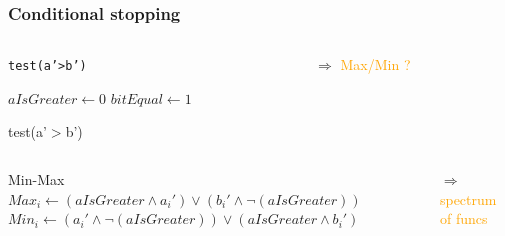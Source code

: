 \documentclass{beamer}
\begin{document}
\begin{frame} 
 \frametitle{Conditional stopping }
\linesnumbered 
\begin{columns}
\begin{column}[c]{9cm}

\begin{block}{\texttt{test(a'>b')}}
\begin{algorithm}[H]

\SetVline
 $aIsGreater \leftarrow 0$\;
 $bitEqual \leftarrow 1$\;
	

\caption{test(a'$>$b')\label{Code:algo}}
\end{algorithm}
\end{block}
\end{column}
\begin{column}[c]{2cm}

 $\Rightarrow$ \textcolor{orange}{Max/Min ?}
\end{column}
\end{columns} 
\pause
\begin{columns}
\begin{column}[c]{8cm}
\begin{block}{Min-Max}
 $Max_i \leftarrow (aIsGreater \wedge a_i') \vee (b_i'\wedge \neg(aIsGreater))$ \;
 $Min_i \leftarrow  (a_i' \wedge \neg(aIsGreater) ) \vee (aIsGreater \wedge b_i')$ \;
\end{block}
\end{column}
\begin{column}[c]{2cm}

$\Rightarrow$ \textcolor{orange}{spectrum of funcs}
\end{column}
\end{columns}
\end{frame}
\end{document}

